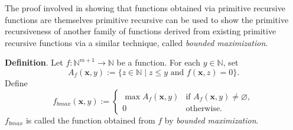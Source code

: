 \documentclass[12pt]{article}
\begin{document}
The proof involved in showing that functions obtained via  primitive recursive functions are themselves primitive recursive can be used to show the primitive recursiveness of another family of functions derived from existing primitive recursive functions via a similar technique, called \emph{bounded maximization}.

\textbf{Definition}.  Let $f:\mathbb{N}^{m+1} \to \mathbb{N}$ be a function.  For each $y\in \mathbb{N}$, set $$A_f(\boldsymbol{x},y):=\lbrace z\in \mathbb{N}\mid z \le y \mbox{ and }f(\boldsymbol{x},z)=0\rbrace.$$  Define
\begin{displaymath}
f_{bmax}(\boldsymbol{x},y):= \left\{
\begin{array}{ll}
\max A_f(\boldsymbol{x},y) & \textrm{if } A_f(\boldsymbol{x},y) \ne \varnothing, \\
0 & \textrm{otherwise.}
\end{array}
\right.
\end{displaymath}
$f_{bmax}$ is called the function obtained from $f$ by \emph{bounded maximization}.
\end{document}
